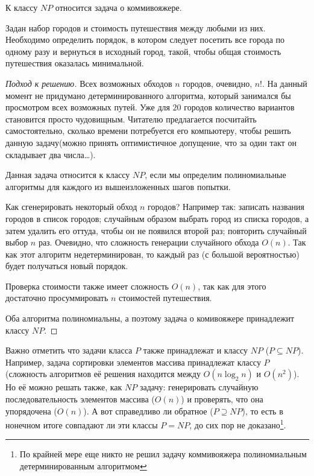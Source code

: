 К классу $NP$ относится задача о коммивояжере.
\begin{exampl}
    Задан набор городов и стоимость путешествия между любыми из них. Необходимо определить порядок, в котором следует посетить все города по одному разу и вернуться в исходный город, такой, чтобы общая стоимость путешествия оказалась минимальной.
\end{exampl}
\begin{proof}[Подход к решению]
    Всех возможных обходов $n$ городов, очевидно, $n!$. На данный момент не придумано детерминированного алгоритма, который занимался бы просмотром всех возможных путей. Уже для $20$ городов количество вариантов становится просто чудовищным. Читателю предлагается посчитайть самостоятельно, сколько времени потребуется его компьютеру, чтобы решить данную задачу(можно принять оптимистичное допущение, что за один такт он складывает два числа\ldots).
    
    Данная задача относится к классу $NP$, если мы определим полиномиальные алгоритмы для каждого из вышеизложенных шагов попытки.
    
    Как сгенерировать некоторый обход $n$ городов? Например так: записать названия городов в список городов; случайным образом выбрать город из списка городов, а затем удалить его оттуда, чтобы он не появился второй раз; повторить случайный выбор $n$ раз. Очевидно, что сложность генерации случайного обхода $O(n)$. Так как этот алгоритм недетерминирован, то каждый раз (с большой вероятностью) будет получаться новый порядок.
    
    Проверка стоимости также имеет сложность $O(n)$, так как для этого достаточно просуммировать $n$ стоимостей путешествия.
    
    Оба алгоритма полиномиальны, а поэтому задача о комивояжере принадлежит классу $NP$.
\end{proof}

Важно отметить что задачи класса $P$ также принадлежат и классу $NP$ ($P\subseteq NP$). Например, задача сортировки элементов массива принадлежат классу $P$ (сложность алгоритмов её решения находится между $O(n\log_2n)$ и $O(n^2)$). Но её можно решать также, как $NP$ задачу: генерировать случайную последовательность элементов массива ($O(n)$) и проверять, что она упорядочена ($O(n)$). А вот справедливо ли обратное ($P\supseteq NP$), то есть в нонечном итоге совпадают ли эти классы $P=NP$, до сих пор не доказано\footnote{По крайней мере еще никто не решил задачу коммивояжера полиномиальным детерминированным алгоритмом}.

